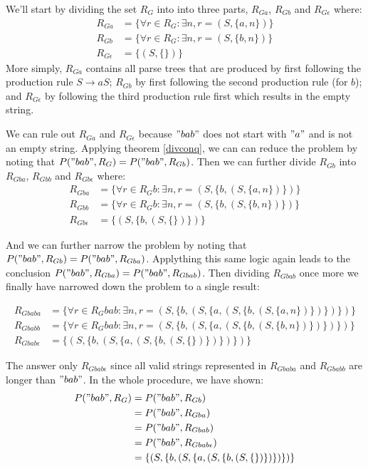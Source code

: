 \documentclass[11pt]{article}
\begin{document}
We'll start by dividing the set $R_G$ into into three parts,
$R_{Ga}$, $R_{Gb}$ and $R_{G\epsilon}$ where:
\begin{align*}
R_{Ga} &= \{ \forall r \in R_G : \exists n , r = (S, \{a,n\}) \}\\
R_{Gb} &= \{ \forall r \in R_G : \exists n , r = (S, \{b,n\}) \}\\
R_{G\epsilon} &= \{ (S, \{\}) \}
\end{align*}
More simply, $R_{Ga}$ contains all parse trees that are produced by first following the production rule $S \rightarrow a S$;
$R_{Gb}$ by first following the second production rule (for $b$); and $R_{G\epsilon}$ by following the third production rule first
which results in the empty string.

We can rule out $R_{Ga}$ and $R_{G\epsilon}$ because $"bab"$ does not start with $"a"$ and is not an empty string.
Applying theorem \ref{divconq}, we can can reduce the problem by noting that $P("bab", R_G) = P("bab", R_{Gb})$.
Then we can further divide $R_{Gb}$ into $R_{Gba}$, $R_{Gbb}$ and $R_{Gb\epsilon}$ where:
\begin{align*}
R_{Gba} &= \{ \forall r \in R_Gb : \exists n , r = (S, \{b, (S, \{a,n\})\}) \} \\
R_{Gbb} &= \{ \forall r \in R_Gb : \exists n , r = (S, \{b, (S, \{b,n\})\}) \} \\
R_{Gb\epsilon} &= \{ (S, \{b, (S, \{\})\}) \}
\end{align*}

And we can further narrow the problem by noting that $P("bab", R_{Gb}) = P("bab", R_{Gba})$.
Applything this same logic again leads to the conclusion $P("bab", R_{Gba}) = P("bab", R_{Gbab})$.
Then dividing $R_{Gbab}$ once more we finally have narrowed down the problem to a single result:

\begin{align*}
R_{Gbaba} &= \{ \forall r \in R_Gbab : \exists n , r = (S, \{b, (S, \{a, (S, \{b, (S, \{a,n\})\})\})\}) \} \\
R_{Gbabb} &= \{ \forall r \in R_Gbab : \exists n , r = (S, \{b, (S, \{a, (S, \{b, (S, \{b,n\})\})\})\}) \} \\
R_{Gbab\epsilon} &= \{ (S, \{b, (S, \{a, (S, \{b, (S, \{\})\})\})\}) \}
\end{align*}

The answer only $R_{Gbab\epsilon}$ since all valid strings represented in $R_{Gbaba}$ and $R_{Gbabb}$ are longer than $"bab"$.
In the whole procedure, we have shown:
\begin{align*}
P("bab", R_G)
&= P("bab", R_{Gb})\\
&= P("bab", R_{Gba})\\
&= P("bab", R_{Gbab})\\
&= P("bab", R_{Gbab\epsilon})\\
&= \{ (S, \{b, (S, \{a, (S, \{b, (S, \{\})\})\})\}) \}
\end{align*}
\end{document}
